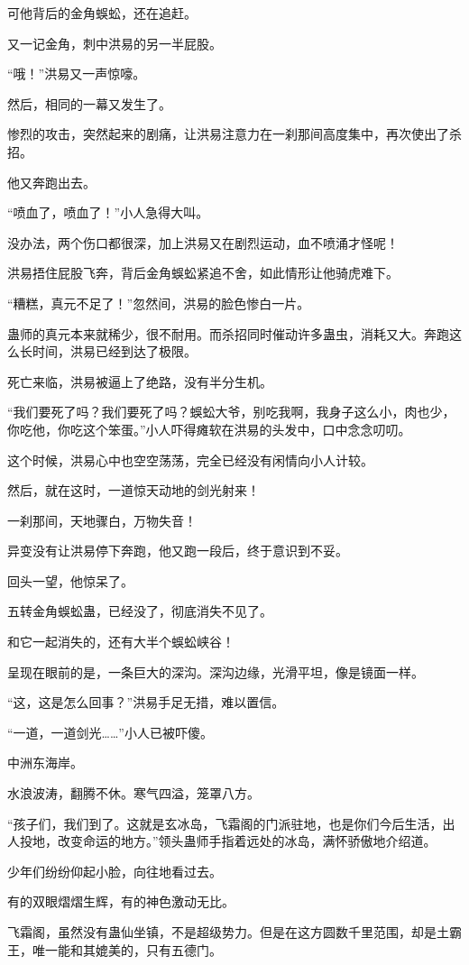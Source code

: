 \begin{this_body}
可他背后的金角蜈蚣，还在追赶。

又一记金角，刺中洪易的另一半屁股。

“哦！”洪易又一声惊嚎。

然后，相同的一幕又发生了。

惨烈的攻击，突然起来的剧痛，让洪易注意力在一刹那间高度集中，再次使出了杀招。

他又奔跑出去。

“喷血了，喷血了！”小人急得大叫。

没办法，两个伤口都很深，加上洪易又在剧烈运动，血不喷涌才怪呢！

洪易捂住屁股飞奔，背后金角蜈蚣紧追不舍，如此情形让他骑虎难下。

“糟糕，真元不足了！”忽然间，洪易的脸色惨白一片。

蛊师的真元本来就稀少，很不耐用。而杀招同时催动许多蛊虫，消耗又大。奔跑这么长时间，洪易已经到达了极限。

死亡来临，洪易被逼上了绝路，没有半分生机。

“我们要死了吗？我们要死了吗？蜈蚣大爷，别吃我啊，我身子这么小，肉也少，你吃他，你吃这个笨蛋。”小人吓得瘫软在洪易的头发中，口中念念叨叨。

这个时候，洪易心中也空空荡荡，完全已经没有闲情向小人计较。

然后，就在这时，一道惊天动地的剑光射来！

一刹那间，天地骤白，万物失音！

异变没有让洪易停下奔跑，他又跑一段后，终于意识到不妥。

回头一望，他惊呆了。

五转金角蜈蚣蛊，已经没了，彻底消失不见了。

和它一起消失的，还有大半个蜈蚣峡谷！

呈现在眼前的是，一条巨大的深沟。深沟边缘，光滑平坦，像是镜面一样。

“这，这是怎么回事？”洪易手足无措，难以置信。

“一道，一道剑光……”小人已被吓傻。

中洲东海岸。

水浪波涛，翻腾不休。寒气四溢，笼罩八方。

“孩子们，我们到了。这就是玄冰岛，飞霜阁的门派驻地，也是你们今后生活，出人投地，改变命运的地方。”领头蛊师手指着远处的冰岛，满怀骄傲地介绍道。

少年们纷纷仰起小脸，向往地看过去。

有的双眼熠熠生辉，有的神色激动无比。

飞霜阁，虽然没有蛊仙坐镇，不是超级势力。但是在这方圆数千里范围，却是土霸王，唯一能和其媲美的，只有五德门。


\end{this_body}
